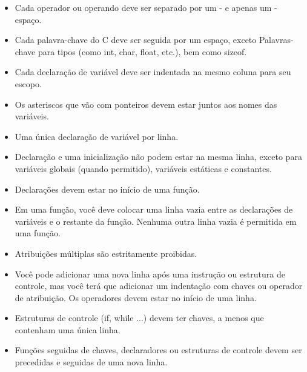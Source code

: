 \documentclass{42-pt}
\begin{document}
\begin{itemize}
                \item Cada operador ou operando deve ser separado por um
                 - e apenas um - espaço.

                \item Cada palavra-chave do C deve ser seguida por um espaço, exceto
                  Palavras-chave para tipos (como int, char, float, etc.),
                  bem como sizeof.

                \item Cada declaração de variável deve ser indentada na mesmo
                  coluna para seu escopo.

                \item Os asteriscos que vão com ponteiros devem estar juntos aos
                  nomes das variáveis.

                \item Uma única declaração de variável por linha.

                \item Declaração e uma inicialização não podem estar
                  na mesma linha, exceto para variáveis globais (quando permitido),
                  variáveis estáticas e constantes.

                \item Declarações devem estar no início de uma função.

                \item Em uma função, você deve colocar uma linha vazia entre as
                    declarações de variáveis e o restante da função.
                    Nenhuma outra linha vazia é permitida em uma função.

                \item Atribuições múltiplas são estritamente proibidas.

                \item Você pode adicionar uma nova linha após uma instrução ou
                  estrutura de controle, mas você terá que adicionar um
                  indentação com chaves ou operador de atribuição.
                  Os operadores devem estar no início de uma linha.

                \item Estruturas de controle (if, while ...) devem ter chaves,
                a menos que contenham uma única linha.
	\item Funções seguidas de chaves, declaradores ou estruturas de controle devem ser precedidas e seguidas de uma nova linha.

            \end{itemize}
\end{document}
